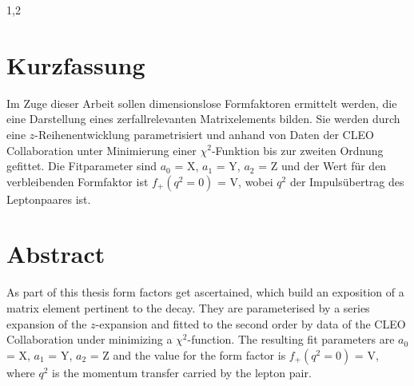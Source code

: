 \documentclass[11pt,a4paper,twoside]{report}
\begin{document}
\begin{spacing}{1,2}
\newpage



\thispagestyle{empty}
\section*{Kurzfassung}
Im Zuge dieser Arbeit sollen dimensionslose Formfaktoren ermittelt werden, die eine Darstellung eines zerfallrelevanten Matrixelements bilden. Sie werden
durch eine $z$-Reihenentwicklung parametrisiert und anhand von Daten der CLEO Collaboration unter Minimierung einer $\chi^2$-Funktion bis zur 
zweiten Ordnung gefittet. Die Fitparameter sind $a_0$ = X, $a_1$ = Y, $a_2$ = Z und der Wert für den verbleibenden Formfaktor ist $f_+(q^2=0)$ = V, wobei 
$q^2$ der Impulsübertrag des Leptonpaares ist.


\section*{Abstract}
As part of this thesis form factors get ascertained, which build an exposition of a matrix element pertinent to the decay. They are parameterised by a
series expansion of the $z$-expansion and fitted to the second order by data of the CLEO Collaboration under minimizing a $\chi^2$-function. The resulting
fit parameters are $a_0$ = X, $a_1$ = Y, $a_2$ = Z and the value for the form factor is $f_+(q^2=0)$ = V, where $q^2$ is the momentum transfer carried by
the lepton pair.


\end{spacing}
\end{document}
